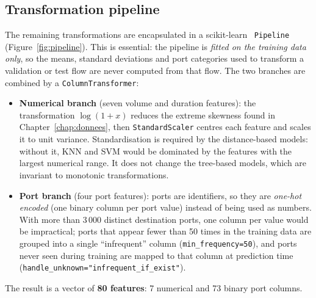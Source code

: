 \subsection{Transformation pipeline}
The remaining transformations are encapsulated in a scikit-learn~\cite{pedregosa2011scikit} \texttt{Pipeline} (Figure~\ref{fig:pipeline}). This is essential: the pipeline is \emph{fitted on the training data only}, so the means, standard deviations and port categories used to transform a validation or test flow are never computed from that flow. The two branches are combined by a \texttt{ColumnTransformer}:
\begin{itemize}
  \item \textbf{Numerical branch} (seven volume and duration features): the transformation $\log(1+x)$ reduces the extreme skewness found in Chapter~\ref{chap:donnees}, then \texttt{StandardScaler} centres each feature and scales it to unit variance. Standardisation is required by the distance-based models: without it, \ac{KNN} and \ac{SVM} would be dominated by the features with the largest numerical range. It does not change the tree-based models, which are invariant to monotonic transformations.
  \item \textbf{Port branch} (four port features): ports are identifiers, so they are \emph{one-hot encoded} (one binary column per port value) instead of being used as numbers. With more than 3\,000 distinct destination ports, one column per value would be impractical; ports that appear fewer than 50 times in the training data are grouped into a single ``infrequent'' column (\texttt{min\_frequency=50}), and ports never seen during training are mapped to that column at prediction time (\texttt{handle\_unknown="infrequent\_if\_exist"}).
\end{itemize}
The result is a vector of \textbf{80 features}: 7 numerical and 73 binary port columns.

